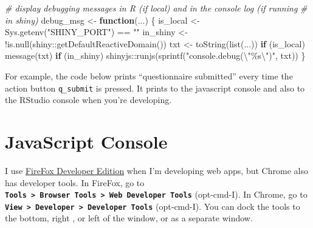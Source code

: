 \documentclass[
  oneside]{book}
\newenvironment{Shaded}{\begin{snugshade}}{\end{snugshade}}
\newcommand{\CommentTok}[1]{\textcolor[rgb]{0.56,0.35,0.01}{\textit{#1}}}
\newcommand{\ControlFlowTok}[1]{\textcolor[rgb]{0.13,0.29,0.53}{\textbf{#1}}}
\newcommand{\FunctionTok}[1]{\textcolor[rgb]{0.00,0.00,0.00}{#1}}
\newcommand{\NormalTok}[1]{#1}
\newcommand{\OtherTok}[1]{\textcolor[rgb]{0.56,0.35,0.01}{#1}}
\newcommand{\SpecialCharTok}[1]{\textcolor[rgb]{0.00,0.00,0.00}{#1}}
\newcommand{\StringTok}[1]{\textcolor[rgb]{0.31,0.60,0.02}{#1}}
\begin{document}
\begin{Shaded}
\begin{Highlighting}[]
\CommentTok{\# display debugging messages in R (if local) and in the console log (if running}
\CommentTok{\# in shiny)}
\NormalTok{debug\_msg }\OtherTok{\textless{}{-}} \ControlFlowTok{function}\NormalTok{(...) \{}
\NormalTok{    is\_local }\OtherTok{\textless{}{-}} \FunctionTok{Sys.getenv}\NormalTok{(}\StringTok{"SHINY\_PORT"}\NormalTok{) }\SpecialCharTok{==} \StringTok{""}
\NormalTok{    in\_shiny }\OtherTok{\textless{}{-}} \SpecialCharTok{!}\FunctionTok{is.null}\NormalTok{(shiny}\SpecialCharTok{::}\FunctionTok{getDefaultReactiveDomain}\NormalTok{())}
\NormalTok{    txt }\OtherTok{\textless{}{-}} \FunctionTok{toString}\NormalTok{(}\FunctionTok{list}\NormalTok{(...))}
    \ControlFlowTok{if}\NormalTok{ (is\_local)}
        \FunctionTok{message}\NormalTok{(txt)}
    \ControlFlowTok{if}\NormalTok{ (in\_shiny)}
\NormalTok{        shinyjs}\SpecialCharTok{::}\FunctionTok{runjs}\NormalTok{(}\FunctionTok{sprintf}\NormalTok{(}\StringTok{"console.debug(}\SpecialCharTok{\textbackslash{}"}\StringTok{\%s}\SpecialCharTok{\textbackslash{}"}\StringTok{)"}\NormalTok{, txt))}
\NormalTok{\}}
\end{Highlighting}
\end{Shaded}

For example, the code below prints ``questionnaire submitted'' every time the action button \texttt{q\_submit} is pressed. It prints to the javascript console and also to the RStudio console when you're developing.

\begin{Shaded}
\end{Shaded}

\hypertarget{javascript-console}{%
\section{JavaScript Console}\label{javascript-console}}

I use \href{https://www.mozilla.org/en-US/firefox/developer/}{FireFox Developer Edition} when I'm developing web apps, but Chrome also has developer tools. In FireFox, go to \textbf{\texttt{Tools\ \textgreater{}\ Browser\ Tools\ \textgreater{}\ Web\ Developer\ Tools}} (opt-cmd-I). In Chrome, go to \textbf{\texttt{View\ \textgreater{}\ Developer\ \textgreater{}\ Developer\ Tools}} (opt-cmd-I). You can dock the tools to the bottom, right , or left of the window, or as a separate window.
\end{document}
